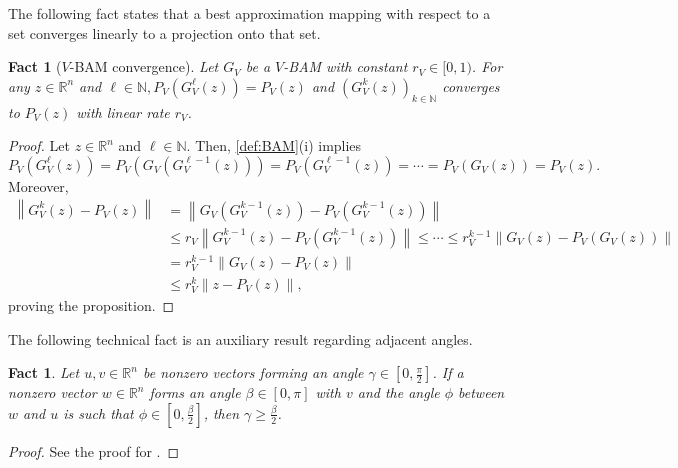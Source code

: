 \documentclass[smallextended,numbook,nospthms]{svjour3}
\theoremstyle{plain}
\newtheorem{fact}[theorem]{Fact}
\theoremstyle{definition}
\def\RR{\mathds R}
\def\NN{\mathds N}
\begin{document}
The following fact states that a best approximation mapping with respect to a set converges linearly to a projection onto that set.
\begin{fact}[$V$-BAM convergence]\label{fact:BAM conv}
	Let $G_{V}$ be a $V$-BAM with constant $r_{V} \in[0,1)$. For any $z \in \RR^{n}$ and $\ell \in \NN, P_{V}\left(G_{V}^{\ell}(z)\right)=P_{V}(z)$ and $\left(G_{V}^{k}(z)\right)_{k \in \NN}$ converges to $P_{V}(z)$ with linear rate $r_{V}$.
\end{fact}
\begin{proof}
	Let $z \in \RR^{n}$ and $\ell \in \NN$. Then, \cref{def:BAM}(i) implies
	$$
	P_{V}\left(G_{V}^{\ell}(z)\right)=P_{V}\left(G_{V}\left(G_{V}^{\ell-1}(z)\right)\right)=P_{V}\left(G_{V}^{\ell-1}(z)\right)=\cdots=P_{V}\left(G_{V}(z)\right)=P_{V}(z).
	$$
	Moreover,
	\begin{align}
		\left\|G_{V}^{k}(z)-P_{V}(z)\right\| &=\left\|G_{V}\left(G_{V}^{k-1}(z)\right)-P_{V}\left(G_{V}^{k-1}(z)\right)\right\| \\
		& \leq r_{V}\left\|G_{V}^{k-1}(z)-P_{V}\left(G_{V}^{k-1}(z)\right)\right\| \leq \cdots \leq r_{V}^{k-1}\left\|G_{V}(z)-P_{V}\left(G_{V}(z)\right)\right\| \\
		&=r_{V}^{k-1}\left\|G_{V}(z)-P_{V}(z)\right\| \\
		& \leq r_{V}^{k}\left\|z-P_{V}(z)\right\|,
	\end{align}
	proving the proposition.
\end{proof}

The following technical fact is an auxiliary result regarding adjacent angles.
\begin{fact}\label{fact:BAM angle fact}
	Let $u, v \in \RR^{n}$ be nonzero vectors forming an angle $\gamma \in\left[0, \frac{\pi}{2}\right]$. If a nonzero vector $w \in \RR^{n}$ forms an angle $\beta \in[0, \pi]$ with $v$ and the angle $\phi$ between $w$ and $u$ is such that $\phi \in\left[0, \frac{\beta}{2}\right]$, then $\gamma \geq \frac{\beta}{2}$.
\end{fact}
\begin{proof}
	See the proof for \cite[Proposition 2]{Behling:2019dj}.
\end{proof}
\end{document}
